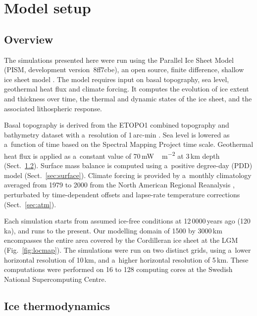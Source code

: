 \documentclass[tc, manuscript]{copernicus}
\begin{document}
\section{Model setup}
\label{sec:model}

\subsection{Overview}
\label{sec:overview}

      The simulations presented here were run using the Parallel Ice Sheet
      Model (PISM, development version~8ff7cbe), an open source, finite
      difference, shallow ice sheet model \citep{PISM-authors.2015}. The
      model requires input on basal topography, sea level, geothermal heat
      flux and climate forcing. It computes the evolution of ice extent and
      thickness over time, the thermal and dynamic states of the ice sheet,
      and the associated lithospheric response.

      Basal topography is derived from the ETOPO1 combined topography and
      bathymetry dataset with a~resolution of 1\,arc-min
      \citep{Amante.Eakins.2009}. Sea level is lowered as a~function of time
      based on the Spectral Mapping Project
      \citep[SPECMAP,][]{Imbrie.etal.1989} time scale. Geothermal heat flux
      is applied as a~constant value of 70\,\unit{mW\,m^{-2}} at
      3\,\unit{km} depth (Sect.~\ref{sec:icedyn}). Surface mass balance is
      computed using a~positive degree-day (PDD) model
      (Sect.~\ref{sec:surface}). Climate forcing is provided by a~monthly
      climatology averaged from 1979 to 2000 from the North American
      Regional Reanalysis \citep[NARR,][]{Mesinger.etal.2006}, perturbated
      by time-dependent offsets and lapse-rate temperature corrections
      (Sect.~\ref{sec:atm}).

      Each simulation starts from assumed ice-free conditions at
      12\,0000\,\unit{years} ago (120\,\unit{ka}), and runs to the
      present. Our modelling domain of 1500 by 3000\,\unit{km} encompasses
      the entire area covered by the Cordilleran ice sheet at the LGM
      (Fig.~\ref{fig:locmap}). The simulations were run on two distinct
      grids, using a~lower horizontal resolution of 10\,\unit{km}, and
      a~higher horizontal resolution of 5\,\unit{km}. These computations
      were performed on 16 to 128 computing cores at the Swedish National
      Supercomputing Centre.

\subsection{Ice thermodynamics}
\label{sec:icedyn}
\end{document}
